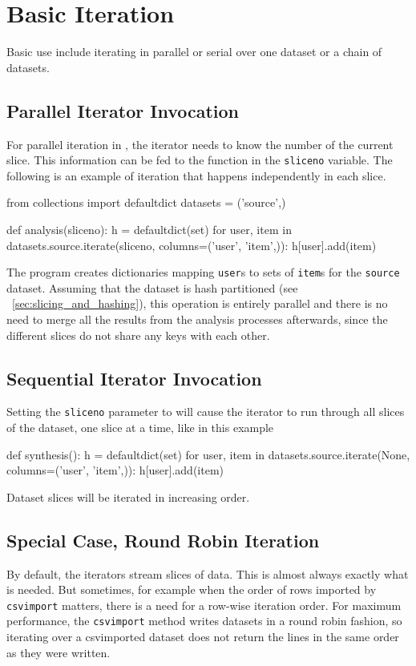 \section{Basic Iteration}
Basic use include iterating in parallel or serial over one dataset or
a chain of datasets.


\subsection{Parallel Iterator Invocation}
For parallel iteration in \analysis, the iterator needs to know the
number of the current slice.  This information can be fed to
the \analysis function in the \texttt{sliceno} variable. The following
is an example of iteration that happens independently in each slice.
\begin{python}
from collections import defaultdict
datasets = ('source',)

def analysis(sliceno):
    h = defaultdict(set)
    for user, item in datasets.source.iterate(sliceno, columns=('user', 'item',)):
        h[user].add(item)
\end{python}
The program creates dictionaries mapping \texttt{user}s to sets of
\texttt{item}s for the \texttt{source} dataset.  Assuming that
the dataset is hash partitioned (see ~\ref{sec:slicing_and_hashing}),
this operation is entirely parallel and there is no need to merge all
the results from the analysis processes afterwards, since the
different slices do not share any keys with each other.



\subsection{Sequential Iterator Invocation}
Setting the \texttt{sliceno} parameter to
\pyNone will cause the iterator to run through all slices of
the dataset, one slice at a time, like in this example
\begin{python}
def synthesis():
    h = defaultdict(set)
    for user, item in datasets.source.iterate(None, columns=('user', 'item',)):
        h[user].add(item)
\end{python}
Dataset slices will be iterated in increasing order.



\subsection{Special Case, Round Robin Iteration}
By default, the iterators stream slices of data.  This is almost
always exactly what is needed.  But sometimes, for example when the
order of rows imported by \texttt{csvimport} matters, there is a need
for a row-wise iteration order.  For maximum performance,
the \texttt{csvimport} method writes datasets in a round robin
fashion, so iterating over a csvimported dataset does not return the
lines in the same order as they were written.


